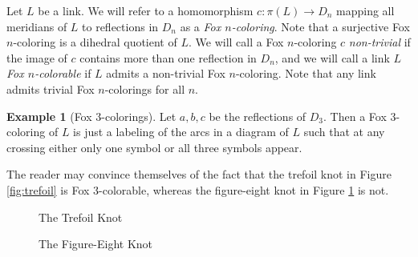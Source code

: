 \documentclass{article}
\theoremstyle{definition}
\newtheorem{example}[theorem]{Example}
\begin{document}
Let $L$ be a link. We will refer to a homomorphism $c: \pi(L) \rightarrow D_n$ mapping all meridians of $L$ to reflections in $D_n$ as a \textit{Fox $n$-coloring}. Note that a surjective Fox $n$-coloring is a dihedral quotient of $L$. We will call a Fox $n$-coloring $c$ \textit{non-trivial} if the image of $c$ contains more than one reflection in $D_n$, and we will call a link $L$ \textit{Fox $n$-colorable} if $L$ admits a non-trivial Fox $n$-coloring. Note that any link admits trivial Fox $n$-colorings for all $n$.

\begin{example}[Fox $3$-colorings]
Let $a, b, c$ be the reflections of $D_3$. Then a Fox $3$-coloring of $L$ is just a labeling of the arcs in a diagram of $L$ such that at any crossing either only one symbol or all three symbols appear.

The reader may convince themselves of the fact that the trefoil knot in Figure \ref{fig:trefoil} is Fox $3$-colorable, whereas the figure-eight knot in Figure \ref{fig:figure-8} is not.

\begin{figure}[ht]
\centering
\begin{minipage}{0.5\textwidth}
 \centering
{}
\caption{The Trefoil Knot}
\label{fig:trefoil}
\end{minipage}%
\begin{minipage}{0.5\textwidth}
\centering
{}
\caption{The Figure-Eight Knot}
\label{fig:figure-8}
\end{minipage}
\end{figure}
\end{example}
\end{document}
